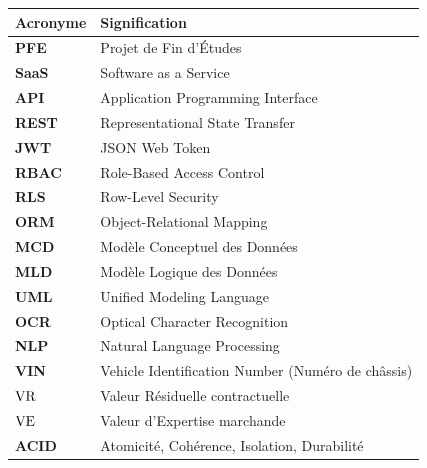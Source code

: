 \documentclass[12pt,a4paper,oneside]{report}
\begin{document}
\noindent\begin{tabularx}{\textwidth}{@{}l Y@{}}
\toprule
\textbf{Acronyme} & \textbf{Signification} \\
\midrule
\textbf{PFE} & Projet de Fin d'Études \\
\textbf{SaaS} & Software as a Service \\
\textbf{API} & Application Programming Interface \\
\textbf{REST} & Representational State Transfer \\
\textbf{JWT} & JSON Web Token \\
\textbf{RBAC} & Role-Based Access Control \\
\textbf{RLS} & Row-Level Security \\
\textbf{ORM} & Object-Relational Mapping \\
\textbf{MCD} & Modèle Conceptuel des Données \\
\textbf{MLD} & Modèle Logique des Données \\
\textbf{UML} & Unified Modeling Language \\
\textbf{OCR} & Optical Character Recognition \\
\textbf{NLP} & Natural Language Processing \\
\textbf{VIN} & Vehicle Identification Number (Numéro de châssis) \\
\textbf{$\text{VR}$} & Valeur Résiduelle contractuelle \\
\textbf{$\text{VE}$} & Valeur d'Expertise marchande \\
\textbf{ACID} & Atomicité, Cohérence, Isolation, Durabilité \\
\bottomrule
\end{tabularx}

\newpage

\setcounter{page}{1}











\nocite{*}

\end{document}
